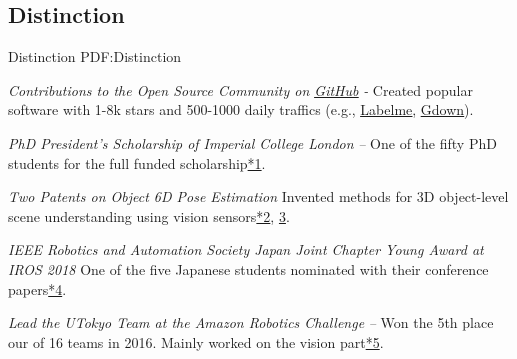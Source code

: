 \documentclass[letterpaper,MMMyyyy,nonstop]{simpleresumecv}
\begin{document}
\begin{body}

\section
{Distinction}
{Distinction}
{PDF:Distinction}

\textit{Contributions to the Open Source Community on \href{https://github.com/wkentaro}{\underline{GitHub}}}
\hfill
{\it {} - }
\newline
Created popular software with 1-8k stars and 500-1000 daily traffics (e.g., \href{https://github.com/wkentaro/labelme}{\underline{Labelme}}, \href{https://github.com/wkentaro/gdown}{\underline{Gdown}}).

\BigGapNoBreak

\textit{PhD President's Scholarship of Imperial College London}
\hfill
{\it {} -- }
\newline
One of the fifty PhD students for the full funded scholarship\href{https://www.imperial.ac.uk/study/pg/fees-and-funding/scholarships/presidents-phd-scholarships/}{*1}.

\BigGapNoBreak

\textit{Two Patents on Object 6D Pose Estimation}
\hfill
{\it {}}
\newline
Invented methods for 3D object-level scene understanding using vision sensors\href{https://patents.google.com/patent/WO2021198666A1/}{*2}, \href{https://patents.google.com/patent/WO2021198665A1/en}{3}.

\BigGapNoBreak

\textit{IEEE Robotics and Automation Society Japan Joint Chapter Young Award at IROS 2018}
\hfill
{\it {}}
\newline
One of the five Japanese students nominated with their conference papers\href{https://www.ieee-jp.org/section/tokyo/chapter/RA-24/RASJPYoungAward_ICRA2018.html}{*4}.

\BigGapNoBreak

\textit{Lead the UTokyo Team at the Amazon Robotics Challenge}
\hfill
{\it {} -- }
\newline
Won the 5th place our of 16 teams in 2016. Mainly worked on the vision part\href{https://github.com/start-jsk/jsk_apc}{*5}.




\end{body}
\end{document}
